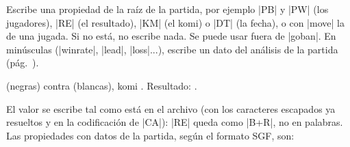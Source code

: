 \begin{command}{\sgfinfo{}}
	Escribe una propiedad de la raíz de la partida, por ejemplo |PB| y |PW| (los jugadores), |RE| (el resultado), |KM| (el komi) o |DT| (la fecha), o con |move| la de una jugada. Si no está, no escribe nada. Se puede usar fuera de |goban|. En minúsculas (|winrate|, |lead|, |loss|...), escribe un dato del análisis de la partida (pág.~\pageref{subsec:sgfanalisis}).

	\begin{codeexample}[]
		 (negras) contra
		 (blancas),
		komi .
		Resultado: .
	\end{codeexample}

	El valor se escribe tal como está en el archivo (con los caracteres escapados ya resueltos y en la codificación de |CA|): |RE| queda como |B+R|, no en palabras. Las propiedades con datos de la partida, según el formato SGF, son:


\end{command}
